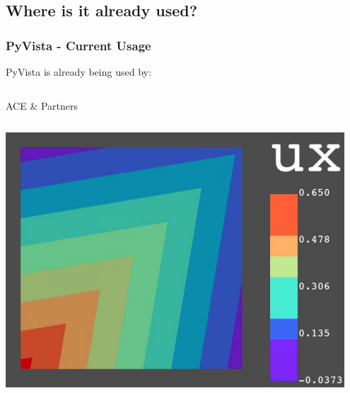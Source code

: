 \documentclass[t]{beamer}
\begin{document}
\subsection{Where is it already used?}
\begin{frame}
  \frametitle{PyVista - Current Usage}

  \vspace{-8pt}
  PyVista is already being used by:
  \vspace{-8pt}

  \begin{columns}[T]
    \begin{column}{.3\textwidth}
        \begin{exampleblock}{ACE \& Partners}
        \inputminted[fontsize=\tiny]{python}{code/dpf_simple.py}
        \centering
        \href{https://www.padtinc.com/2022/07/18/ansys-scripting-python-p1-solve-post/}{\includegraphics[width=0.95\textwidth]{figures/dpf_simple.png}}
        \end{exampleblock}
      \end{column}


\end{columns}
\end{frame}
\end{document}
